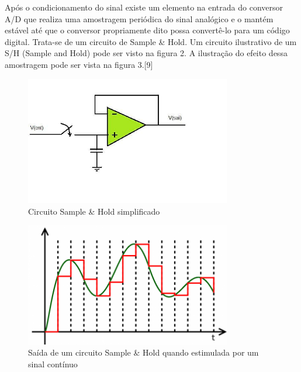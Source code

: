 Após o condicionamento do sinal existe um elemento na entrada do conversor A/D que realiza uma amostragem periódica do sinal analógico e o mantém estável até que o conversor propriamente dito possa convertê-lo para um código digital. Trata-se de um circuito de Sample \& Hold. Um circuito ilustrativo de um S/H (Sample and Hold) pode ser visto na figura 2. A ilustração do efeito dessa amostragem pode ser vista na figura 3.[9]

\begin{figure}[H]
	\centering
	\includegraphics[width=9cm]{figuras/circuito_sample.jpg}
	\caption{Circuito Sample \& Hold simplificado} \label{circuito_sample}
\end{figure}

\begin{figure}[H]
	\centering
	\includegraphics[width=9cm]{figuras/saida_sample.png}
	\caption{Saída de um circuito Sample \& Hold quando estimulada por um sinal contínuo} \label{saida_sample}
\end{figure}

